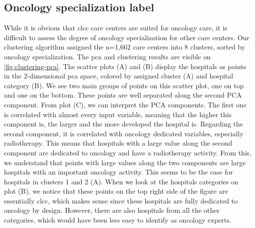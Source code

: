 \subsection{Oncology specialization label}

While it is obvious that \ac{clcc} care centers are suited for oncology care, it
is difficult to assess the degree of oncology specialization for other care
centers. Our clustering algorithm assigned the n=1,662 care centers into 8
clusters, sorted by oncology specialization. The \ac{pca} and clustering results
are visible on \cref{fig:clustering-pca}. The scatter plots (A) and (B) display
the hospitals as points in the 2-dimensional \ac{pca} space, colored by assigned
cluster (A) and hospital category (B). We see two main groups of points on this
scatter plot, one on top and one on the bottom. These points are well separated
along the second PCA component. From plot (C), we can interpret the PCA
components. The first one is correlated with almost every input variable,
meaning that the higher this component is, the larger and the more developed the
hospital is. Regarding the second component, it is correlated with oncology
dedicated variables, especially radiotherapy. This means that hospitals with a
large value along the second component are dedicated to oncology and have a
radiotherapy activity. From this, we understand that points with large values
along the two components are large hospitals with an important oncology
activity. This seems to be the case for hospitals in clusters 1 and 2 (A).
When we look at the hospitals categories on plot (B), we notice that these
points on the top right side of the figure are essentially \ac{clcc}, which
makes sense since these hospitals are fully dedicated to oncology by design.
However, there are also hospitals from all the other categories, which would
have been less easy to identify as oncology experts.

